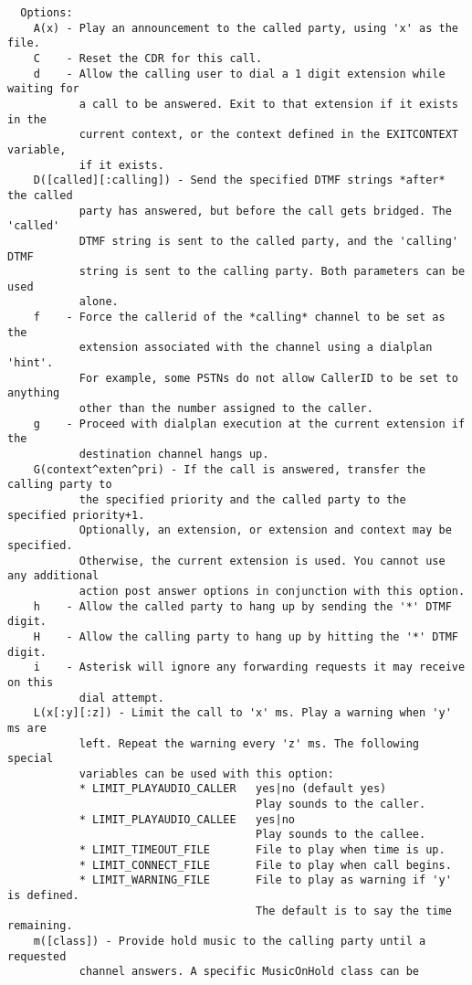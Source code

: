 \begin{verbatim}
  Options:
    A(x) - Play an announcement to the called party, using 'x' as the file.
    C    - Reset the CDR for this call.
    d    - Allow the calling user to dial a 1 digit extension while waiting for
           a call to be answered. Exit to that extension if it exists in the
           current context, or the context defined in the EXITCONTEXT variable,
           if it exists.
    D([called][:calling]) - Send the specified DTMF strings *after* the called
           party has answered, but before the call gets bridged. The 'called'
           DTMF string is sent to the called party, and the 'calling' DTMF
           string is sent to the calling party. Both parameters can be used
           alone.
    f    - Force the callerid of the *calling* channel to be set as the
           extension associated with the channel using a dialplan 'hint'.
           For example, some PSTNs do not allow CallerID to be set to anything
           other than the number assigned to the caller.
    g    - Proceed with dialplan execution at the current extension if the
           destination channel hangs up.
    G(context^exten^pri) - If the call is answered, transfer the calling party to
           the specified priority and the called party to the specified priority+1.
           Optionally, an extension, or extension and context may be specified. 
           Otherwise, the current extension is used. You cannot use any additional
           action post answer options in conjunction with this option.
    h    - Allow the called party to hang up by sending the '*' DTMF digit.
    H    - Allow the calling party to hang up by hitting the '*' DTMF digit.
    i    - Asterisk will ignore any forwarding requests it may receive on this
           dial attempt.
    L(x[:y][:z]) - Limit the call to 'x' ms. Play a warning when 'y' ms are
           left. Repeat the warning every 'z' ms. The following special
           variables can be used with this option:
           * LIMIT_PLAYAUDIO_CALLER   yes|no (default yes)
                                      Play sounds to the caller.
           * LIMIT_PLAYAUDIO_CALLEE   yes|no
                                      Play sounds to the callee.
           * LIMIT_TIMEOUT_FILE       File to play when time is up.
           * LIMIT_CONNECT_FILE       File to play when call begins.
           * LIMIT_WARNING_FILE       File to play as warning if 'y' is defined.
                                      The default is to say the time remaining.
    m([class]) - Provide hold music to the calling party until a requested
           channel answers. A specific MusicOnHold class can be

\end{verbatim}
